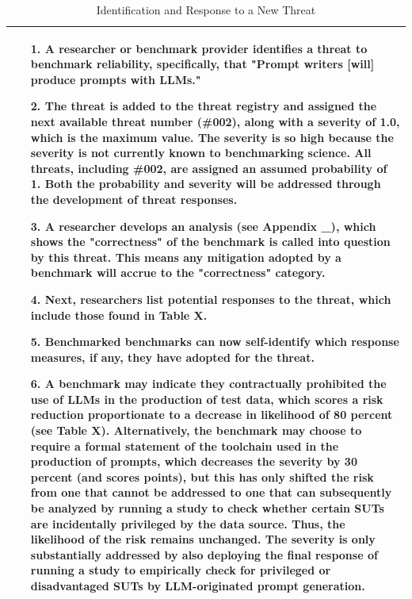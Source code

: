 \documentclass{article}
\begin{document}
\begin{table}[h!]
  \caption{Identification and Response to a New Threat}
  \label{tab:identification-response}
  \centering
  \begin{tabular}{p{12cm}}
    \toprule
    \begin{itemize} 
      \item[1.] A researcher or benchmark provider identifies a threat to benchmark reliability, specifically, that "Prompt writers [will] produce prompts with LLMs."
      \item[2.] The threat is added to the threat registry and assigned the next available threat number (\#002), along with a severity of 1.0, which is the maximum value. The severity is so high because the severity is not currently known to benchmarking science. All threats, including \#002, are assigned an assumed probability of 1. Both the probability and severity will be addressed through the development of threat responses.
      \item[3.] A researcher develops an analysis (see Appendix \_), which shows the "correctness" of the benchmark is called into question by this threat. This means any mitigation adopted by a benchmark will accrue to the "correctness" category. 
      \item[4.] Next, researchers list potential responses to the threat, which include those found in Table X.
      \item[5.] Benchmarked benchmarks can now self-identify which response measures, if any, they have adopted for the threat.
      \item[6.] A benchmark may indicate they contractually prohibited the use of LLMs in the production of test data, which scores a risk reduction proportionate to a decrease in likelihood of 80 percent (see Table X). Alternatively, the benchmark may choose to require a formal statement of the toolchain used in the production of prompts, which decreases the severity by 30 percent (and scores points), but this has only shifted the risk from one that cannot be addressed to one that can subsequently be analyzed by running a study to check whether certain SUTs are incidentally privileged by the data source. Thus, the likelihood of the risk remains unchanged. The severity is only substantially addressed by also deploying the final response of running a study to empirically check for privileged or disadvantaged SUTs by LLM-originated prompt generation.
    \end{itemize} \\
    \bottomrule
  \end{tabular}
\end{table}
\end{document}
